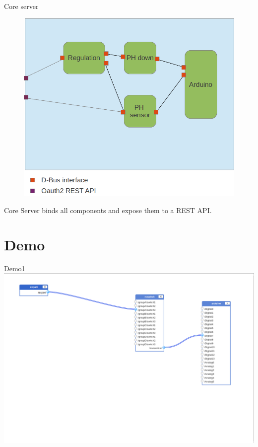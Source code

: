 \documentclass{beamer}
\begin{document}
\begin{frame}{Core server}


\begin{figure}
\includegraphics[width=0.7\columnwidth]{./figures/application.png}
\end{figure}
Core Server binds all components and expose them to a REST API.
\end{frame}
\section{Demo}

\begin{frame}{Demo1}
\includegraphics[width=\columnwidth]{figures/config1.png}
\end{frame}
\end{document}
